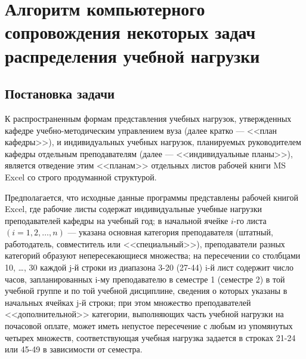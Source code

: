 





\chapter{Алгоритм компьютерного сопровождения некоторых задач распределения учебной нагрузки}\label{AKM_ch3}

\section{Постановка задачи}\label{AKM_ch3_1}

К распространенным формам представления учебных нагрузок, утвержденных кафедре учебно-методическим управлением вуза
(далее кратко --- <<план кафедры>>), и индивидуальных учебных нагрузок, планируемых руководителем кафедры отдельным
преподавателям (далее --- <<индивидуальные планы>>), является отведение этим <<планам>> отдельных листов рабочей книги MS
Excel со строго продуманной структурой.

Предполагается, что исходные данные программы представлены рабочей книгой \foreignlanguage{english}{Excel}, где рабочие
листы содержат индивидуальные учебные нагрузки преподавателей кафедры на учебный год; в начальной ячейке
$i$-го листа $(i=1,2, \ldots, n)$ --- указана
основная категория преподавателя (штатный, работодатель, совместитель или <<специальный>>), преподаватели разных
категорий образуют непересекающиеся множества; на пересечении со столбцами 10, …, 30 каждой
\foreignlanguage{english}{j}{}-й строки из диапазона 3-20 (27-44) \foreignlanguage{english}{i}{}-й лист содержит число
часов, запланированных \foreignlanguage{english}{i}{}-му преподавателю в семестре 1 (семестре 2) в той учебной группе и
по той учебной дисциплине, сведения о которых указаны в начальных ячейках \foreignlanguage{english}{j}{}-й строки; при
этом множество преподавателей <<дополнительной>> категории, выполняющих часть учебной нагрузки на почасовой оплате, может
иметь непустое пересечение с любым из упомянутых четырех множеств, соответствующая учебная нагрузка задается в строках
21-24 или 45-49 в зависимости от семестра.

